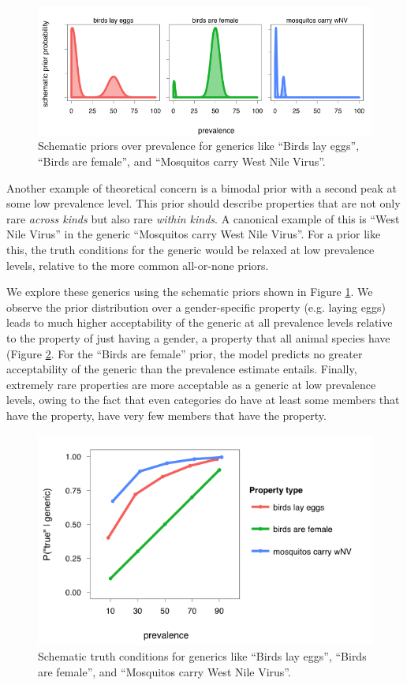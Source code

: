 \documentclass[10pt,letterpaper]{article}
\begin{document}
\begin{figure}
  \begin{center}
    \includegraphics[width=0.8\columnwidth]{schematicPriors}
  \end{center}
  \caption{Schematic priors over prevalence for generics like ``Birds lay eggs'', ``Birds are female'', and ``Mosquitos carry West Nile Virus''.}
   \label{fig:schematic}
\end{figure}

Another example of theoretical concern is a bimodal prior with a second peak at some low prevalence level. This prior should describe properties that are not only rare \emph{across kinds} but also rare \emph{within kinds}. A canonical example of this is ``West Nile Virus'' in the generic ``Mosquitos carry West Nile Virus''. For a prior like this, the truth conditions for the generic would be relaxed at low prevalence levels, relative to the more common all-or-none priors. 


We explore these generics using the schematic priors shown in Figure \ref{fig:schematic}. We observe the prior distribution over a gender-specific property (e.g. laying eggs) leads to much higher acceptability of the generic at all prevalence levels relative to the property of just having a gender, a property that all animal species have (Figure \ref{fig:schem_tc}. For the ``Birds are female'' prior, the model predicts no greater acceptability of the generic than the prevalence estimate entails. Finally, extremely rare properties are more acceptable as a generic at low prevalence levels, owing to the fact that even categories do have at least some members that have the property, have very few members that have the property.

\begin{figure}
  \begin{center}
    \includegraphics[width=0.8\columnwidth]{schematic_tc}
  \end{center}
  \caption{Schematic truth conditions for generics like ``Birds lay eggs'', ``Birds are female'', and ``Mosquitos carry West Nile Virus''.}
   \label{fig:schem_tc}
\end{figure}
\end{document}
